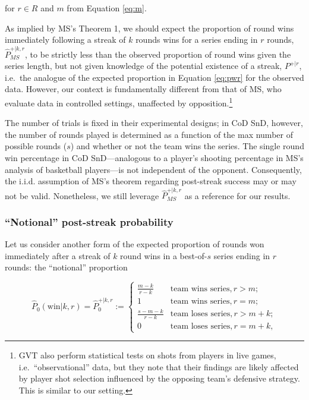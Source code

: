 \documentclass{article}
\begin{document}
for \(r \in R\) and \(m\) from Equation \ref{eq:m}.

As implied by MS's Theorem 1, we should expect the proportion of round
wins immediately following a streak of \(k\) rounds wins for a series
ending in \(r\) rounds, \(\hat{P}^{+|k,r}_{MS}\), to be strictly less
than the observed proportion of round wins given the series length, but
not given knowledge of the potential existence of a streak, \(P^{+|r}\),
i.e.~the analogue of the expected proportion in Equation \ref{eq:pwr}
for the observed data. However, our context is fundamentally different
from that of MS, who evaluate data in controlled settings, unaffected by
opposition.\footnote{GVT also perform statistical tests on shots from
  players in live games, i.e.~``observational'' data, but they note that
  their findings are likely affected by player shot selection influenced
  by the opposing team's defensive strategy. This is similar to our
  setting.}

The number of trials is fixed in their experimental designs; in CoD SnD,
however, the number of rounds played is determined as a function of the
max number of possible rounds (\(s\)) and whether or not the team wins
the series. The single round win percentage in CoD SnD---analogous to a
player's shooting percentage in MS's analysis of basketball players---is
not independent of the opponent. Consequently, the i.i.d. assumption of
MS's theorem regarding post-streak success may or may not be valid.
Nonetheless, we still leverage \(\hat{P}^{+|k,r}_{MS}\) as a reference
for our results.

\hypertarget{notional-post-streak-probability}{%
\subsubsection{``Notional'' post-streak
probability}\label{notional-post-streak-probability}}

Let us consider another form of the expected proportion of rounds won
immediately after a streak of \(k\) round wins in a best-of-\(s\) series
ending in \(r\) rounds: the ``notional'' proportion

\begin{equation}\label{eq:pwkr}
\hat{P}_0(\text{win} | k, r) = \hat{P}^{+|k,r}_0 := \begin{cases}
\frac{m - k}{r - k} & \text{team wins series}, r > m; \\
1 & \text{team wins series}, r = m; \\
\frac{s - m - k}{r - k} & \text{team loses series}, r > m + k; \\
0 & \text{team loses series}, r = m + k,
\end{cases}
\end{equation}
\end{document}
